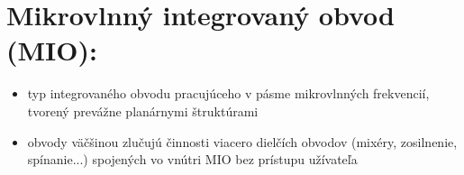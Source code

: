 	\section{Mikrovlnný integrovaný obvod (MIO):} \label{tema:MIO}
	\begin{itemize}[label=--]
	\item typ integrovaného obvodu pracujúceho v pásme mikrovlnných frekvencií, tvorený prevážne planárnymi štruktúrami
	\item obvody väčšinou zlučujú činnosti viacero dielčích obvodov (mixéry, zosilnenie, spínanie...) spojených vo vnútri MIO bez prístupu užívateľa
	\end{itemize}
	\bigskip

